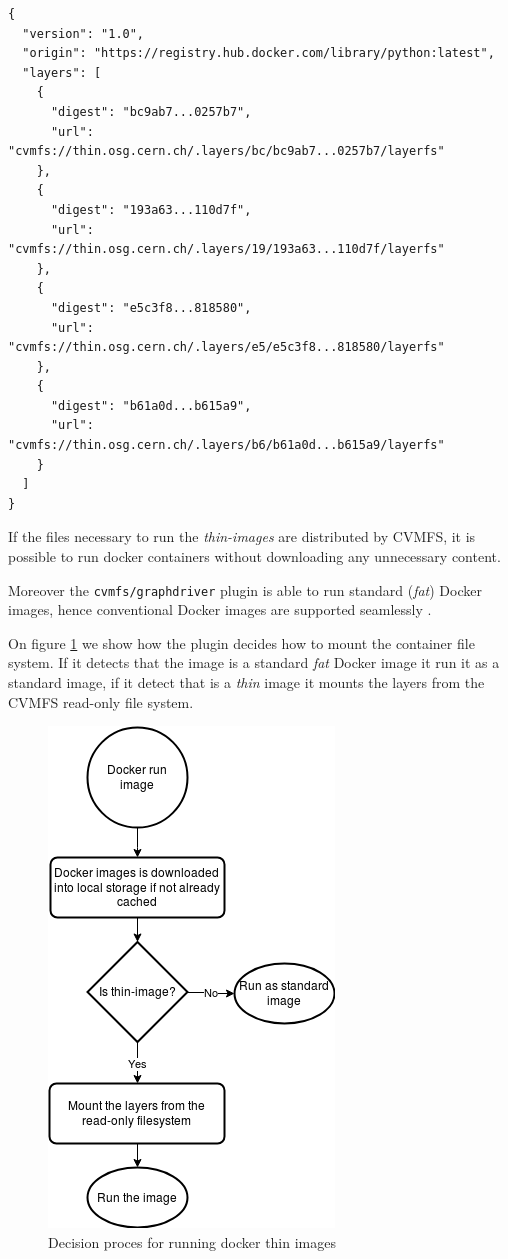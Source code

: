 \begin{minipage}{\linewidth}
\begin{lstlisting}[caption={Example of a \textit{recipe} file of a Docker \textit{thin image}},label={lst:thin-example}]
{
  "version": "1.0",
  "origin": "https://registry.hub.docker.com/library/python:latest",
  "layers": [
    {
      "digest": "bc9ab7...0257b7",
      "url": "cvmfs://thin.osg.cern.ch/.layers/bc/bc9ab7...0257b7/layerfs"
    },
    {
      "digest": "193a63...110d7f",
      "url": "cvmfs://thin.osg.cern.ch/.layers/19/193a63...110d7f/layerfs"
    },
    {
      "digest": "e5c3f8...818580",
      "url": "cvmfs://thin.osg.cern.ch/.layers/e5/e5c3f8...818580/layerfs"
    },
    {
      "digest": "b61a0d...b615a9",
      "url": "cvmfs://thin.osg.cern.ch/.layers/b6/b61a0d...b615a9/layerfs"
    }
  ]
}
\end{lstlisting}
\end{minipage}



If the files necessary to run the \textit{thin-images} are distributed by CVMFS, it is
possible to run docker containers without downloading any unnecessary content.

Moreover the \texttt{cvmfs/graphdriver} plugin is able to run standard (\textit{fat})
Docker images, hence conventional Docker images are supported seamlessly \cite{graphdriver-plugin}.

On figure \ref{fig:flowchart-run-thin-image} we show how the plugin decides how
to mount the container file system. If it detects that the image is a standard
\textit{fat} Docker image it run it as a standard image, if it detect that is a
\textit{thin} image it mounts the layers from the CVMFS read-only file system.

\begin{figure}
\includegraphics{gfx/RunThinImages}
\caption{Decision proces for running docker thin images}
\label{fig:flowchart-run-thin-image}
\end{figure}

